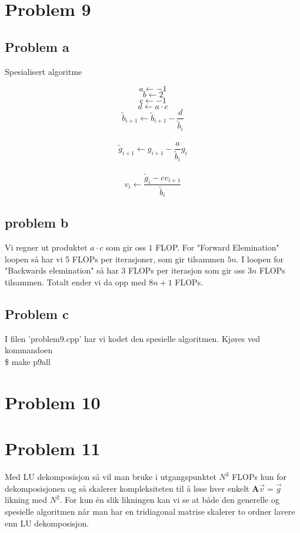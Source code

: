 \documentclass[english,notitlepage]{revtex4-1}  %
\begin{document}
\section*{Problem 9}

\subsection*{Problem a}

\begin{algorithm}[H]
	\caption{Spesialisert algoritme}\label{algo:spec}
	\begin{algorithmic}
	\State $$a \leftarrow -1$$
	\State $$b \leftarrow 2$$
	\State $$c \leftarrow -1$$
	\State $$d \leftarrow a \cdot c$$ 
	 
	\State $$\widetilde{b}_{i+1} \leftarrow \widetilde{b}_{i+1} - \frac{d}{\widetilde{b}_i}$$  \\
	\State $$\widetilde{g}_{i+1} \leftarrow g_{i+1} - \frac{a}{\widetilde{b}_i}g_i$$  \\
	\EndFor
	 
	\State $$v_i \leftarrow \frac{\widetilde{g}_i - cv_{i+1}}{\widetilde{b}_i}$$  
	\EndFor
	\end{algorithmic}
\end{algorithm}

\subsection*{problem b}

Vi regner ut produktet $a \cdot c$ som gir oss $1$ FLOP. For "Forward Elemination" loopen så har vi 5 FLOPs per iterasjoner, som gir tilsammen $5n$. I loopen for "Backwards elemination" så har 3 FLOPs per iterasjon som gir oss $3n$ FLOPs tilsammen. Totalt ender vi da opp med $8n + 1$ FLOPs.

\subsection*{Problem c}

I filen 'problem9.cpp' har vi kodet den spesielle algoritmen. Kjøres ved kommandoen \\

\$ make p9all

\section*{Problem 10}

\section*{Problem 11}

Med LU dekomposisjon så vil man bruke i utgangspunktet $N^3$ FLOPs kun for dekomposisjonen og så skalerer kompleksiteten til å løse hver enkelt $\textbf{A}\vec{v}= \vec{g}$ likning med $N^2$. For kun én slik likningen kan vi se at både den generelle og spesielle algoritmen når man har en tridiagonal matrise skalerer to ordner lavere enn LU dekomposisjon.
\end{document}
